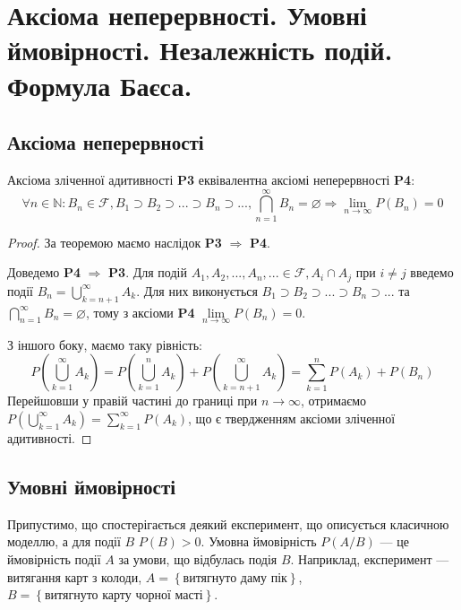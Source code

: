 \section{Аксіома неперервності. Умовні ймовірності. Незалежність подій. Формула Баєса.}

\subsection{Аксіома неперервності}
\begin{theorem}
    Аксіома зліченної адитивності \textbf{P3} еквівалентна аксіомі неперервності
    \textbf{P4}: $$\forall n \in \mathbb{N}: B_n \in \mathcal{F}, B_1 \supset B_2 \supset ... \supset B_n \supset ..., \bigcap\limits_{n=1}^{\infty} B_n = \varnothing \Rightarrow \lim_{n\rightarrow \infty} P(B_n) = 0$$
    \begin{proof}
        За теоремою  маємо наслідок \textbf{P3} $\Rightarrow$ \textbf{P4}.

        Доведемо \textbf{P4} $\Rightarrow$ \textbf{P3}. Для подій $A_1, A_2, ... , A_n, ... \in \mathcal{F}, A_i \cap A_j \text{ при } i \neq j$
        введемо події $B_n = \bigcup\limits_{k=n+1}^{\infty} A_k$. Для них виконується $B_1 \supset B_2 \supset ... \supset B_n \supset ...$ та $\bigcap\limits_{n=1}^{\infty} B_n = \varnothing$,
        тому з аксіоми \textbf{P4} $\lim\limits_{n\rightarrow \infty} P(B_n) = 0$.

        З іншого боку, маємо таку рівність:
        $$P\left(\bigcup\limits_{k=1}^{\infty} A_k\right) = P\left(\bigcup\limits_{k=1}^{n} A_k\right) + P\left(\bigcup\limits_{k=n+1}^{\infty} A_k\right) = \sum\limits_{k=1}^{n} P(A_k) + P(B_n)$$
        Перейшовши у правій частині до границі при $n \rightarrow \infty$, отримаємо $P\left(\bigcup\limits_{k=1}^{\infty} A_k\right) = \sum\limits_{k=1}^{\infty} P(A_k)$, 
        що є твердженням аксіоми зліченної адитивності.
    \end{proof}
\end{theorem}

\subsection{Умовні ймовірності}
Припустимо, що спостерігається деякий експеримент, що описується класичною моделлю, а для події $B$ $P(B)>0$.
Умовна ймовірність $P(A/B)$ --- це ймовірність події $A$ за умови, що відбулась подія $B$.
Наприклад, експеримент --- витягання карт з колоди, $A=\left\{\text{витягнуто даму пік}\right\}$, $B=\left\{\text{витягнуто карту чорної масті}\right\}$.

